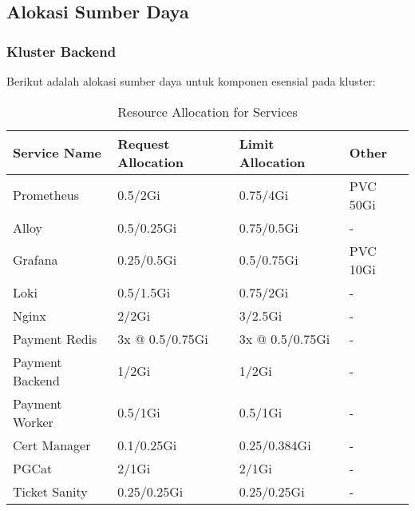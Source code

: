 \subsection{Alokasi Sumber Daya}

\subsubsection{Kluster Backend}

Berikut adalah alokasi sumber daya untuk komponen esensial pada kluster:

\begin{table}[htpb]
    \centering
    \caption{Resource Allocation for Services}
    \label{tab:resource_allocation}
    \begin{tabular}{|l|l|l|l|}
        \hline
        \textbf{Service Name} & \textbf{Request Allocation} & \textbf{Limit Allocation} & \textbf{Other} \\ \hline
        Prometheus            & 0.5/2Gi                     & 0.75/4Gi                  & PVC 50Gi       \\ \hline
        Alloy                 & 0.5/0.25Gi                  & 0.75/0.5Gi                & -              \\ \hline
        Grafana               & 0.25/0.5Gi                  & 0.5/0.75Gi                & PVC 10Gi       \\ \hline
        Loki                  & 0.5/1.5Gi                   & 0.75/2Gi                  & -              \\ \hline
        Nginx                 & 2/2Gi                       & 3/2.5Gi                   & -              \\ \hline
        Payment Redis         & 3x @ 0.5/0.75Gi             & 3x @ 0.5/0.75Gi           & -              \\ \hline
        Payment Backend       & 1/2Gi                       & 1/2Gi                     & -              \\ \hline
        Payment Worker        & 0.5/1Gi                     & 0.5/1Gi                   & -              \\ \hline
        Cert Manager          & 0.1/0.25Gi                  & 0.25/0.384Gi              & -              \\ \hline
        PGCat                 & 2/1Gi                       & 2/1Gi                     & -              \\ \hline
        Ticket Sanity         & 0.25/0.25Gi                 & 0.25/0.25Gi               & -              \\ \hline
    \end{tabular}
\end{table}

